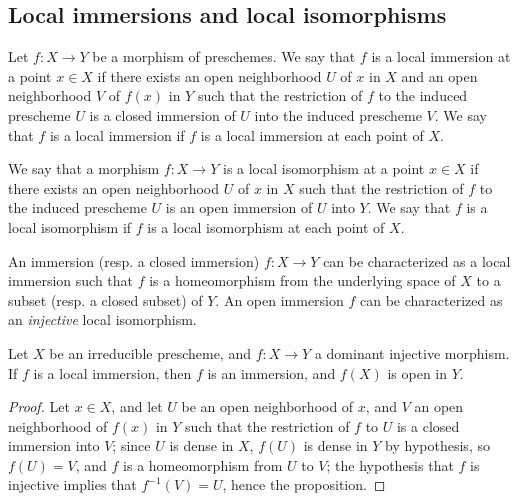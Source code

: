 \subsection{Local immersions and local isomorphisms}
\label{subsection:I.4.5}

\begin{definition}[4.5.1]
\label{I.4.5.1}
Let $f:X\to Y$ be a morphism of preschemes.
We say that $f$ is a local immersion at a point $x\in X$ if there exists an open neighborhood $U$ of $x$ in $X$ and an open neighborhood $V$ of $f(x)$ in $Y$ such that the restriction of $f$ to the induced prescheme $U$ is a closed immersion of $U$ into the induced prescheme $V$.
We say that $f$ is a local immersion if $f$ is a local immersion at each point of $X$.
\end{definition}

\begin{definition}[4.5.2]
\label{I.4.5.2}
We say that a morphism $f:X\to Y$ is a local isomorphism at
a point $x\in X$ if there exists an open neighborhood $U$ of $x$ in $X$ such that the restriction of $f$ to the induced prescheme $U$ is an open immersion of $U$ into $Y$.
We say that $f$ is a local isomorphism if $f$ is a local isomorphism at each point of $X$.
\end{definition}

\begin{env}[4.5.3]
\label{I.4.5.3}
An immersion (resp. a closed immersion) $f:X\to Y$ can be characterized as a local immersion such that $f$ is a homeomorphism from the underlying space of $X$ to a subset (resp. a closed subset) of $Y$.
An open immersion $f$ can be characterized as an \emph{injective} local isomorphism.
\end{env}

\begin{proposition}[4.5.4]
\label{I.4.5.4}
Let $X$ be an irreducible prescheme, and $f:X\to Y$ a dominant injective morphism.
If $f$ is a local immersion, then $f$ is an immersion, and $f(X)$ is open in $Y$.
\end{proposition}

\begin{proof}
\label{proof-1.4.5.4}
Let $x\in X$, and let $U$ be an open neighborhood of $x$, and $V$ an open neighborhood of $f(x)$ in $Y$ such that the restriction of $f$ to $U$ is a closed immersion into $V$;
since $U$ is dense in $X$, $f(U)$ is dense in $Y$ by hypothesis, so $f(U)=V$, and $f$ is a homeomorphism from $U$ to $V$;
the hypothesis that $f$ is injective implies that $f^{-1}(V)=U$, hence the proposition.
\end{proof}

